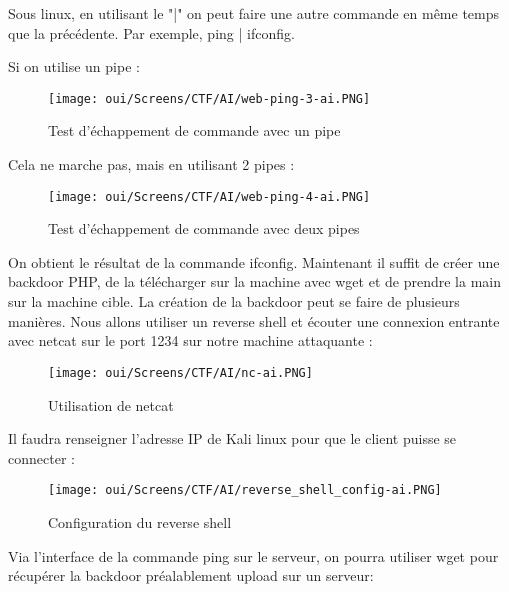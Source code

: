 \noindent Sous linux, en utilisant le "|" on peut faire une autre commande en même temps que la précédente. Par exemple, ping | ifconfig. 

\noindent Si on utilise un pipe :

\begin{figure}[htp!]
  \centering
  \setlength\figureheight{7cm}
  \setlength\figurewidth{9cm}
  \texttt{[image: oui/Screens/CTF/AI/web-ping-3-ai.PNG]}   
  \caption{Test d'échappement de commande avec un pipe}
  \label{fig:courbe-tikz}
\end{figure}

\newpage

\noindent Cela ne marche pas, mais en utilisant 2 pipes :

\begin{figure}[htp!]
  \centering
  \setlength\figureheight{7cm}
  \setlength\figurewidth{9cm}
  \texttt{[image: oui/Screens/CTF/AI/web-ping-4-ai.PNG]}   
  \caption{Test d'échappement de commande avec deux pipes}
  \label{fig:courbe-tikz}
\end{figure}

\noindent On obtient le résultat de la commande ifconfig. Maintenant il suffit de créer une backdoor PHP, de la télécharger sur la machine avec wget et de prendre la main sur la machine cible.
La création de la backdoor peut se faire de plusieurs manières. Nous allons utiliser un reverse shell et écouter une connexion entrante avec netcat sur le port 1234 sur notre machine attaquante :

\begin{figure}[htp!]
  \centering
  \setlength\figureheight{7cm}
  \setlength\figurewidth{9cm}
  \texttt{[image: oui/Screens/CTF/AI/nc-ai.PNG]}   
  \caption{Utilisation de netcat}
  \label{fig:courbe-tikz}
\end{figure}

\newpage

\noindent Il faudra renseigner l'adresse IP de Kali linux pour que le client puisse se connecter :

\begin{figure}[htp!]
  \centering
  \setlength\figureheight{7cm}
  \setlength\figurewidth{9cm}
  \texttt{[image: oui/Screens/CTF/AI/reverse\_shell\_config-ai.PNG]}   
  \caption{Configuration du reverse shell}
  \label{fig:courbe-tikz}
\end{figure}

\noindent Via l'interface de la commande ping sur le serveur, on pourra utiliser wget pour récupérer la backdoor préalablement upload sur un serveur:


